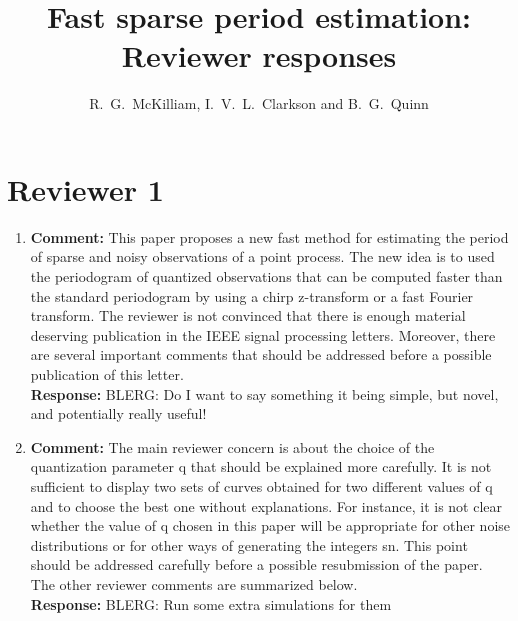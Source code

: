 \documentclass[a4paper,10pt]{article}
\title{Fast sparse period estimation: Reviewer responses}
\author{R.~G.~McKilliam, I.~V.~L.~Clarkson and B.~G.~Quinn 
}
\begin{document}
\maketitle


\section*{Reviewer 1}\label{sec:reviewer-1}

\begin{enumerate}

\item\textbf{Comment:}
This paper proposes a new fast method for estimating the period of sparse and noisy
observations of a point process. The new idea is to used the periodogram of quantized
observations that can be computed faster than the standard periodogram by using
a chirp z-transform or a fast Fourier transform. The reviewer is not convinced that
there is enough material deserving publication in the IEEE signal processing letters.
Moreover, there are several important comments that should be addressed before a
possible publication of this letter.
\\
\textbf{Response:}
BLERG: Do I want to say something it being simple, but novel, and potentially really useful!

\item\textbf{Comment:}
The main reviewer concern is about the choice of the quantization parameter
q that should be explained more carefully. It is not suﬃcient to display two sets
of curves obtained for two diﬀerent values of q and to choose the best one without
explanations. For instance, it is not clear whether the value of q chosen in this paper
will be appropriate for other noise distributions or for other ways of generating the
integers sn. This point should be addressed carefully before a possible resubmission
of the paper. The other reviewer comments are summarized below.
\\
\textbf{Response:}
BLERG: Run some extra simulations for them


\end{enumerate}
\end{document}
